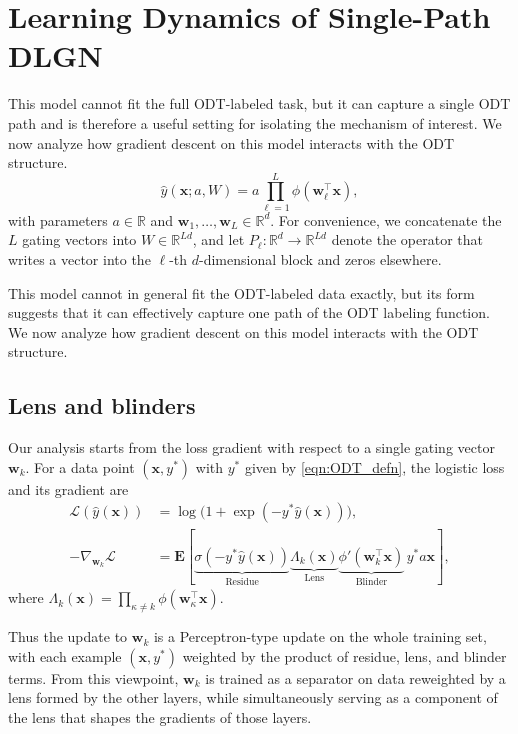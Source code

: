\documentclass{article}
\theoremstyle{plain}
\theoremstyle{definition}
\theoremstyle{remark}
\newcommand{\R}{{\mathbb R}}
\newcommand{\E}{{\mathbf E}}
\newcommand{\1}{{\mathbf 1}}
\newcommand{\0}{{\mathbf 0}}
\newcommand{\w}{{\mathbf w}}
\newcommand{\x}{{\mathbf x}}
\renewcommand{\>}{{\rightarrow}}
\begin{document}
\section{Learning Dynamics of Single-Path DLGN}
\label{sec:single-path-DLGN}

This model cannot fit the full ODT-labeled task, but it can capture a single ODT path and is therefore a useful setting for isolating the mechanism of interest. We now analyze how gradient descent on this model interacts with the ODT structure.
\[
\hat y(\x; a, W) = a \prod_{\ell=1}^L \phi(\w_\ell^\top \x),
\]
with parameters $a \in \R$ and $\w_1,\ldots,\w_L \in \R^d$. For convenience, we concatenate the $L$ gating vectors into $W \in \R^{Ld}$, and let $P_\ell:\R^d\to\R^{Ld}$ denote the operator that writes a vector into the $\ell$-th $d$-dimensional block and zeros elsewhere.

This model cannot in general fit the ODT-labeled data exactly, but its form suggests that it can effectively capture one path of the ODT labeling function. We now analyze how gradient descent on this model interacts with the ODT structure.

\subsection{Lens and blinders}

Our analysis starts from the loss gradient with respect to a single gating vector $\w_k$. For a data point $(\x,y^*)$ with $y^*$ given by \eqref{eqn:ODT_defn}, the logistic loss and its gradient are
\begin{align}
\mathcal{L}(\hat y(\x))
&= \log\!\big(1+\exp(-y^* \hat y(\x))\big), \nonumber \\
-\nabla_{\w_k} \mathcal{L}
&= \E\!\left[ \underbrace{\sigma(-y^* \hat y(\x))}_{\text{Residue}}
 \underbrace{\Lambda_k(\x)}_{\text{Lens}}
 \underbrace{\phi'(\w_k^\top \x)}_{\text{Blinder}} \, y^* a \x \right],
\label{eqn:ResidueLensBlinder}
\end{align}
where $\Lambda_k(\x) = \prod_{\kappa \neq k} \phi(\w_\kappa^\top \x)$.

Thus the update to $\w_k$ is a Perceptron-type update on the whole training set, with each example $(\x,y^*)$ weighted by the product of residue, lens, and blinder terms. From this viewpoint, $\w_k$ is trained as a separator on data reweighted by a lens formed by the other layers, while simultaneously serving as a component of the lens that shapes the gradients of those layers.
\end{document}
